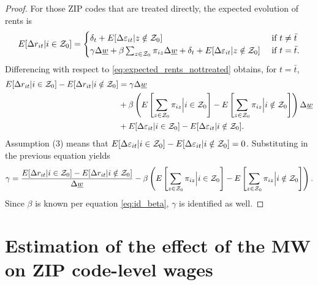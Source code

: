 \begin{proof}
    For those ZIP codes that are treated directly, the expected evolution of 
    rents is
    \begin{equation*}\label{eq:expected_rents_treated}
        E[\Delta r_{it} | i\in\mathcal{Z}_0] = 
        \begin{cases}
            \delta_t + E[\Delta \varepsilon_{it} | z\notin\mathcal{Z}_0] 
                                       & \text{ if } t\neq\bar{t} \\
            \gamma\Delta\underline{w} + \beta\sum_{z\in\mathcal{Z}_0}\pi_{iz}\Delta\underline{w} + \delta_t 
                     + E[\Delta \varepsilon_{it} | z\notin\mathcal{Z}_0] 
                                       & \text{ if } t=\bar{t} .
        \end{cases}
    \end{equation*}
    Differencing with respect to \eqref{eq:expected_rents_nottreated} obtains, 
    for $t=\bar{t}$,
    \begin{equation*}
        \begin{split}
            E[\Delta r_{it} | i\in\mathcal{Z}_0] - E[\Delta r_{it} | i\notin\mathcal{Z}_0] 
              & = \gamma \Delta \underline{w}  \\
              & + \beta \left(E\left[\sum_{z\in\mathcal{Z}_0}\pi_{iz} \Big| i\in\mathcal{Z}_0\right]
                           - E\left[\sum_{z\in\mathcal{Z}_0}\pi_{iz} \Big| i\notin\mathcal{Z}_0\right]\right) \Delta \underline{w}  \\
              & + E[\Delta \varepsilon_{it} | i\in\mathcal{Z}_0] - E[\Delta \varepsilon_{it} | i\notin\mathcal{Z}_0] .
        \end{split}
    \end{equation*}
    Assumption (3) means that
    $E[\Delta \varepsilon_{it} | i\in\mathcal{Z}_0] 
      - E[\Delta \varepsilon_{it} | i\notin\mathcal{Z}_0] = 0$.
    Substituting in the previous equation yields
    \begin{equation}\label{eq:id_gamma}
        \gamma = \frac{E[\Delta r_{it} | i\in\mathcal{Z}_0] - E[\Delta r_{it} | i\notin\mathcal{Z}_0]}{\Delta\underline{w}}
            - \beta \left(E\left[\sum_{z\in\mathcal{Z}_0}\pi_{iz} \Big| i\in\mathcal{Z}_0   \right] 
                        - E\left[\sum_{z\in\mathcal{Z}_0}\pi_{iz} \Big| i\notin\mathcal{Z}_0\right]\right) .
    \end{equation}
    Since $\beta$ is known per equation \eqref{eq:id_beta}, $\gamma$ is identified
    as well.
\end{proof}


\clearpage
\section{Estimation of the effect of the MW on ZIP code-level wages}
\label{sec:mw_on_income}

